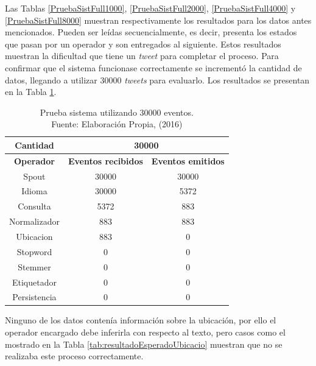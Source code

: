 Las Tablas \ref{PruebaSistFull1000}, \ref{PruebaSistFull2000}, \ref{PruebaSistFull4000} y \ref{PruebaSistFull8000} muestran respectivamente los resultados para los datos antes mencionados. Pueden ser leídas secuencialmente, es decir, presenta los estados que pasan por un operador y son entregados al siguiente. Estos resultados muestran la dificultad que tiene un \textit{tweet} para completar el proceso. Para confirmar que el sistema funcionase correctamente se incrementó la cantidad de datos, llegando a utilizar 30000 \textit{tweets} para evaluarlo. Los resultados se presentan en la Tabla \ref{tab:PruebaSistFull30000}.

\begin{table}[H]
\centering
\caption[Prueba sistema utilizando 30000 eventos.]{Prueba sistema utilizando 30000 eventos.\\Fuente: Elaboración Propia, (2016)}
\label{tab:PruebaSistFull30000}
\begin{tabular}{|c|c|c|}
\hline
\textbf{Cantidad} & \multicolumn{2}{c|}{\textbf{30000}} \\ \hline
\textbf{Operador} & \multicolumn{1}{c|}{\textbf{Eventos recibidos}} & \multicolumn{1}{c|}{\textbf{Eventos emitidos}} \\ \hline
Spout & 30000 & 30000 \\ \hline
Idioma & 30000 & 5372 \\ \hline
Consulta & 5372 & 883 \\ \hline
Normalizador & 883 & 883 \\ \hline
Ubicacion & 883 & 0 \\ \hline
Stopword & 0 & 0 \\ \hline
Stemmer & 0 & 0 \\ \hline
Etiquetador & 0 & 0 \\ \hline
Persistencia & 0 & 0 \\ \hline
\end{tabular}
\end{table}

Ninguno de los datos contenía información sobre la ubicación, por ello el operador encargado debe inferirla con respecto al texto, pero casos como el mostrado en la Tabla \ref{tab:resultadoEsperadoUbicacio} muestran que no se realizaba este proceso correctamente.


